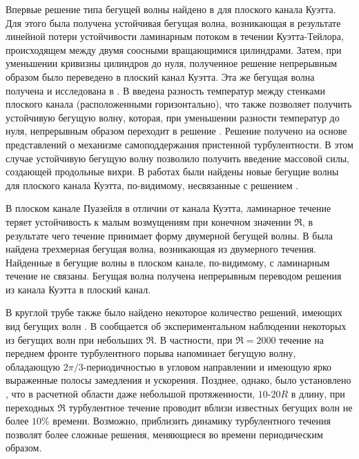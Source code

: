Впервые решение типа бегущей волны найдено в \cite{Nagata1990} для плоского канала Куэтта. Для этого была получена устойчивая бегущая волна, возникающая в результате линейной потери устойчивости ламинарным потоком в течении Куэтта-Тейлора, происходящем между двумя соосными вращающимися цилиндрами. Затем, при уменьшении кривизны цилиндров до нуля, полученное решение непрерывным образом было переведено в плоский канал Куэтта. Эта же бегущая волна получена и исследована в \cite{Clever1992, Waleffe1998, Waleffe2003}. В \cite{Clever1992} введена разность температур между стенками плоского канала (расположенными горизонтально), что также позволяет получить устойчивую бегущую волну, которая, при уменьшении разности температур до нуля, непрерывным образом переходит в решение \cite{Nagata1990}. Решение \cite{Waleffe1998, Waleffe2003} получено на основе представлений о механизме самоподдержания пристенной турбулентности. В этом случае устойчивую бегущую волну позволило получить введение массовой силы, создающей продольные вихри. В работах \cite{Gibson2008, Gibson2009, Itano2009, Nagata1997, Schmiegel1999} были найдены новые бегущие волны для плоского канала Куэтта, по-видимому, несвязанные с решением \cite{Nagata1990}. 

В плоском канале Пуазейля в отличии от канала Куэтта, ламинарное течение теряет устойчивость к малым возмущениям при конечном значении $\Re$, в результате чего течение принимает форму двумерной бегущей волны. В \cite{Ehrenstein1991} была найдена трехмерная бегущая волна, возникающая из двумерного течения. Найденные в \cite{Waleffe1998, Waleffe2001, Waleffe2003, Itano2001} бегущие волны в плоском канале, по-видимому, с ламинарным течение не связаны. Бегущая волна \cite{Waleffe1998, Waleffe2001, Waleffe2003} получена непрерывным переводом решения \cite{Nagata1990} из канала Куэтта в плоский канал. 

В круглой трубе также было найдено некоторое количество решений, имеющих вид бегущих волн \cite{Faisst2003, Wedin2004, Pringle2007, Pringle2009, Altmeyer2015}. В \cite{Hof2004} сообщается об экспериментальном наблюдении некоторых из бегущих волн \cite{Faisst2003, Wedin2004} при небольших $\Re$. В частности, при $\Re = 2000$ течение на переднем фронте турбулентного порыва напоминает бегущую волну, обладающую $2\pi/3$-периодичностью в угловом направлении и имеющую ярко выраженные полосы замедления и ускорения. Позднее, однако, было установлено \cite{Kerswell2007}, что в расчетной области даже небольшой протяженности, $10$-$20R$ в длину, при переходных $\Re$ турбулентное течение проводит вблизи известных бегущих волн не более $10\%$ времени. Возможно, приблизить динамику турбулентного течения позволят более сложные решения, меняющиеся во времени периодическим образом.

